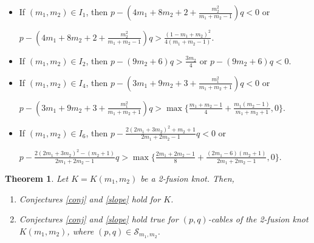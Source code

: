 \documentclass[11pt]{amsart}
\numberwithin{equation}{section}
\theoremstyle{plain}
\newtheorem{theorem}{Theorem}[section]
\theoremstyle{definition}
\def\CS{\mathcal S}
\begin{document}
\begin{itemize}

\item  If $ (m_1, m_2) \in I_1$, then   $p- \left( 4m_1 + 8m_2 + 2 + \frac{m_2^2}{ m_1 + m_2 - 1} \right) q < 0$ or 

$p- \left( 4m_1 + 8m_2 + 2 + \frac{m_2^2}{ m_1 + m_2 - 1} \right) q > \frac{(1 - m_1 + m_2)^2}{4(m_1 + m_2 -1)}$.

\smallskip

\item  If $ (m_1, m_2) \in I_2$,  then $p- ( 9 m_2 + 6) q > \frac{3m_2}{4} \mbox{ or } p- ( 9 m_2 + 6) q < 0$.



\smallskip

\item If $ (m_1, m_2) \in I_4$, then $p-\left( 3m_1 + 9m_2 + 3 + \frac{m_1^2}{m_1 + m_2+1} \right) q < 0$ or 

$p- \left( 3m_1 + 9m_2 + 3 + \frac{m_1^2}{m_1 + m_2+1} \right) q > \max\{  \frac{m_1 + m_2 -1}{4} + \frac{m_1 (m_2 - 1)}{m_1 + m_2 + 1}, 0\}$.




\smallskip

\item If $(m_1, m_2) \in I_6$, then
$p- \frac {2(2 m_1 + 3 m_2)^2 + m_2 + 1} {2 m_1 + 2 m_2-1}  q < 0$ or

$p- \frac {2(2 m_1 + 3 m_2)^2 - (m_2 + 1)} {2 m_1 + 2 m_2-1}  q > \max\{ \frac{2m_1 + 2m_2 -1}{8} + \frac{(2m_1-6) (m_2+1)}{2m_1 + 2m_2 - 1}, 0\}$.
\end{itemize}

\begin{theorem}
\label{thm:slope-cable} Let $K=K(m_1, m_2)$ be a  2-fusion knot. Then, 

\begin{enumerate}
\item Conjectures  \ref{conj} and \ref{slope}  hold  for $K$.
\item Conjectures \ref{conj} and \ref{slope} hold true for $(p,q)$-cables of the 2-fusion knot $K(m_1, m_2)$, where $(p,q) \in \CS_{m_1,m_2}$.
\end{enumerate}
\end{theorem}
\end{document}
